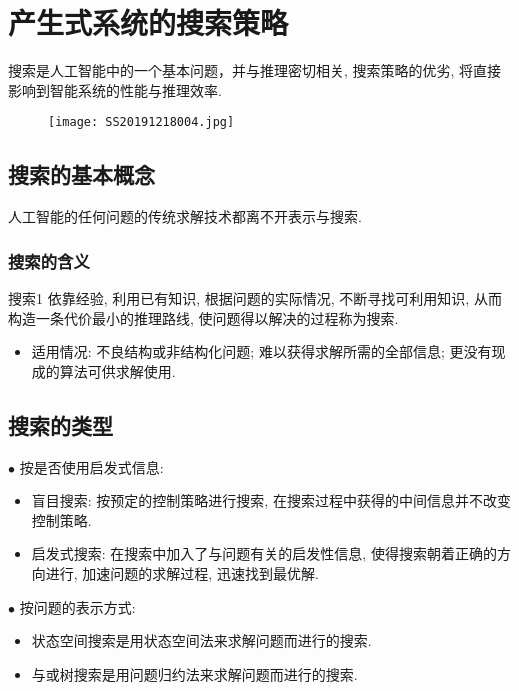 \chapter{产生式系统的搜索策略}\label{AIchap4}
\begin{tcolorbox}[colback=white!50,colframe=orange!50,title=搜索]
    搜索是人工智能中的一个基本问题，并与推理密切相关, 搜索策略的优劣, 将直接影响到智能系统的性能与推理效率.\hfill
\end{tcolorbox}
\begin{figure}[H]
    \centering
    \texttt{[image: SS20191218004.jpg]}
    \label{SS20191218004}
\end{figure}
\section{搜索的基本概念}
    人工智能的任何问题的传统求解技术都离不开表示与搜索.
\subsection{搜索的含义}
\begin{mydef}{搜索}{1}
    依靠经验, 利用已有知识, 根据问题的实际情况, 不断寻找可利用知识, 从而构造一条代价最小的推理路线, 使问题得以解决的过程称为搜索.
\end{mydef}

\begin{itemize}
\item 适用情况: 不良结构或非结构化问题; 难以获得求解所需的全部信息; 更没有现成的算法可供求解使用.
\end{itemize}
\section{搜索的类型}

    $\bullet$ 按是否使用启发式信息:
    \begin{itemize}
        \item 盲目搜索: 按预定的控制策略进行搜索, 在搜索过程中获得的中间信息并不改变控制策略.
        \item 启发式搜索: 在搜索中加入了与问题有关的启发性信息, 使得搜索朝着正确的方向进行, 加速问题的求解过程, 迅速找到最优解.
    \end{itemize}
    $\bullet$ 按问题的表示方式:
    \begin{itemize}
        \item 状态空间搜索是用状态空间法来求解问题而进行的搜索.
        \item 与或树搜索是用问题归约法来求解问题而进行的搜索.
    \end{itemize}
